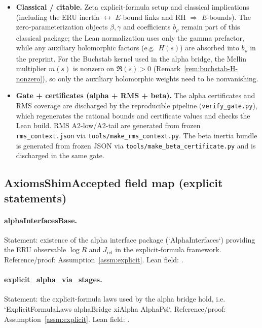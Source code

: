 \begin{itemize}
\begin{itemize}
    These are discharged by Lemmas \ref{lem:a1-from-supercritical-buchstab}
    and \ref{lem:buchstab-coefficient}, yielding \texttt{A1\_from\_supercritical}.
  \end{itemize}
  These bridges do not replace the classical A/B/C assumptions; they supply the
  A1/A2 inputs needed for the RMS-local contradiction.
  \item \textbf{Classical / citable.} Zeta explicit-formula setup and classical implications (including the ERU inertia $\leftrightarrow$ $E$-bound links and RH $\Rightarrow$ $E$-bounds). The zero-parameterization objects $\beta,\gamma$ and coefficients $b_\rho$ remain part of this classical package; the Lean normalization uses only the gamma prefactor, while any auxiliary holomorphic factors (e.g.\ $H(s)$) are absorbed into $b_\rho$ in the preprint. For the Buchstab kernel used in the alpha bridge, the Mellin multiplier $m(s)$ is nonzero on $\Re(s)>0$ (Remark~\ref{rem:buchstab-H-nonzero}), so only the auxiliary holomorphic weights need to be nonvanishing.
  \item \textbf{Gate + certificates (alpha + RMS + beta).} The alpha certificates and RMS coverage are discharged by the reproducible pipeline (\texttt{verify\_gate.py}), which regenerates the rational bounds and certificate values and checks the Lean build. RMS A2-low/A2-tail are generated from frozen \texttt{rms\_context.json} via \texttt{tools/make\_rms\_context.py}. The beta inertia bundle is generated from frozen JSON via \texttt{tools/make\_beta\_certificate.py} and is discharged in the same gate.
\end{itemize}

\subsection*{AxiomsShimAccepted field map (explicit statements)}

\paragraph{alphaInterfacesBase.}
Statement: existence of the alpha interface package (`AlphaInterfaces`) providing
the ERU observable $\log R$ and $J_{\mathrm{rel}}$ in the explicit-formula framework.
Reference/proof: Assumption~\ref{assm:explicit}. Lean field:
\allowbreak{}.

\paragraph{explicit\_alpha\_via\_stages.}
Statement: the explicit-formula laws used by the alpha bridge hold, i.e.
`ExplicitFormulaLaws alphaBridge xiAlpha AlphaPsi`.
Reference/proof: Assumption~\ref{assm:explicit}. Lean field:
\allowbreak{}.

